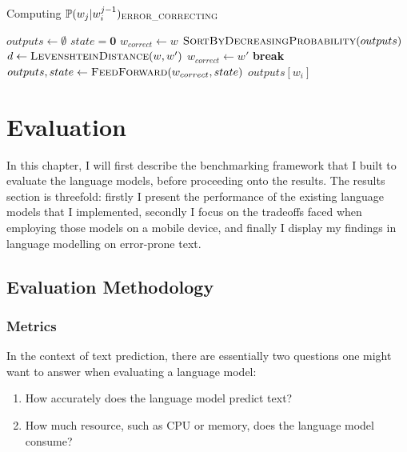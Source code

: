 \documentclass[a4paper, 12pt]{report}
\newcommand{\tbf}[1]{\textbf{#1}}
\begin{document}
\begin{algorithm}
\caption{Computing $\mathbb{P}(w_j | w_i^{j - 1})_{\text{\scshape ERROR\_CORRECTING}}$}
\label{alg:error_correction}
\begin{algorithmic}[1]
\State $outputs \gets \emptyset$
\State $state = \mathbf{0}$
	\State $w_{correct} \gets w$
	\If {$w \notin dictionary\ \tbf{and}\ outputs \neq \emptyset$}
		\State $\text{\scshape SortByDecreasingProbability}(outputs)$
			\State $d \gets \text{\scshape LevenshteinDistance}(w, w')$
				\State $w_{correct} \gets w'$
				\State \textbf{break}
			\EndIf
		\EndFor
	\EndIf
	\State $outputs, state \gets \text{\scshape FeedForward}(w_{correct}, state)$
\EndFor
\State \Return $outputs[w_i]$
\EndProcedure
\end{algorithmic}
\end{algorithm}

\chapter{Evaluation} \label{evaluation}

In this chapter, I will first describe the benchmarking framework that I built to evaluate the language models, before proceeding onto the results. The results section is threefold: firstly I present the performance of the existing language models that I implemented, secondly I focus on the tradeoffs faced when employing those models on a mobile device, and finally I display my findings in language modelling on error-prone text.

\section{Evaluation Methodology}

\subsection{Metrics} \label{metrics}

In the context of text prediction, there are essentially two questions one might want to answer when evaluating a language model:
\begin{enumerate}
\item
	How accurately does the language model predict text?
\item
	How much resource, such as CPU or memory, does the language model consume?
\end{enumerate}
\end{document}

